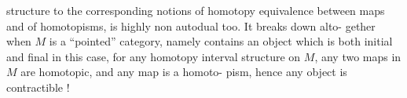 structure to the corresponding notions of homotopy equivalence between
maps and of homotopisms,  is highly non autodual too.  It breaks down alto-%
gether when $M$ is a ``pointed'' category,  namely  contains an object which
is both initial and final \hand{-}  in this case,   for any homotopy interval
structure on $M$,  any two maps in $M$ are homotopic,  and any map is a homoto-%
pism,  hence any object is contractible !

